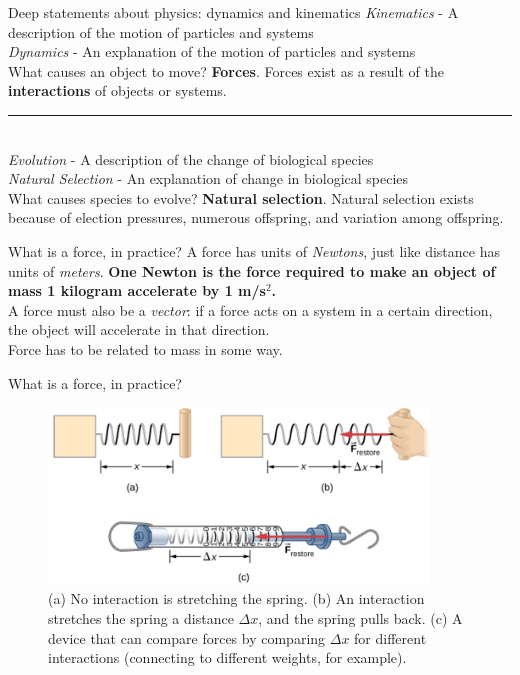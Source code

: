 \documentclass{beamer}
\begin{document}
\begin{frame}{Deep statements about physics: dynamics and kinematics}
\small
\textit{Kinematics} - A \alert{description} of the motion of particles and systems \\
\textit{Dynamics} - An \alert{explanation} of the motion of particles and systems \\
\vspace{0.25cm}
What causes an object to move?  \textbf{Forces}.  Forces exist as a result of the \alert{\textbf{interactions}} of objects or systems.\\
\vspace{0.25cm}
\rule{10cm}{0.4pt} \\
\vspace{0.25cm}
\textit{Evolution} - A \alert{description} of the change of biological species \\
\textit{Natural Selection} - An \alert{explanation} of change in biological species \\
\vspace{0.25cm}
What causes species to evolve?  \textbf{Natural selection}.  Natural selection exists because of \alert{election pressures}, \alert{numerous offspring}, and \alert{variation} among offspring.
\end{frame}

\begin{frame}{What is a force, in practice?}
A force has units of \textit{Newtons}, just like distance has units of \textit{meters}.  \textbf{One Newton is the force required to make an object of mass 1 kilogram accelerate by 1 m/s$^2$.} \\
\vspace{1cm}
A force must also be a \textit{vector}: if a force acts on a system in a certain direction, the object will accelerate in that direction. \\
\vspace{1cm}
Force has to be related to mass in some way.
\end{frame}

\begin{frame}{What is a force, in practice?}
\small
\begin{figure}
\centering
\includegraphics[width=0.9\textwidth]{figures/force1.png}
\caption{\label{fig:force1} (a) No interaction is stretching the spring.  (b) An interaction stretches the spring a distance $\Delta x$, and the spring pulls back.  (c) A device that can compare forces by comparing $\Delta x$ for different interactions (connecting to different weights, for example).}
\end{figure}
\end{frame}
\end{document}
